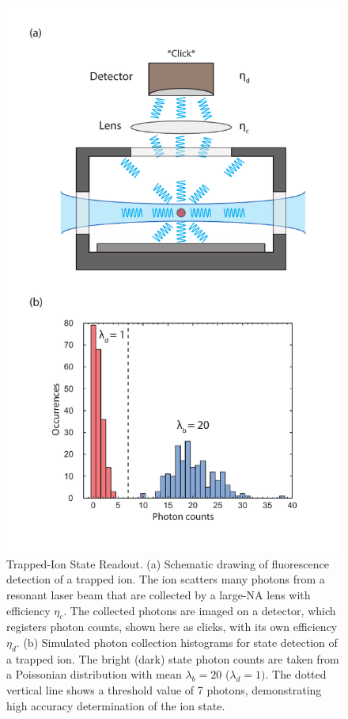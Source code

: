 \documentclass[%
12pt,
 amsmath,amssymb,
]{revtex4-2}
\begin{document}
\begin{figure}
    \centering
    \includegraphics[scale=0.7]{Verticalv3.pdf}
    \caption{Trapped-Ion State Readout. (a) Schematic drawing of fluorescence detection of a trapped ion. The ion scatters many photons from a resonant laser beam that are collected by a large-NA lens with efficiency $\eta_{c}$. The collected photons are imaged on a detector, which registers photon counts, shown here as clicks, with its own efficiency $\eta_{d}$. (b) Simulated photon collection histograms for state detection of a trapped ion. The bright (dark) state photon counts are taken from a Poissonian distribution with mean $\lambda_{b}=20$ ($\lambda_{d}=1)$. The dotted vertical line shows a threshold value of 7 photons, demonstrating high accuracy determination of the ion state.}
    \label{fig:detection}
\end{figure}
\end{document}
